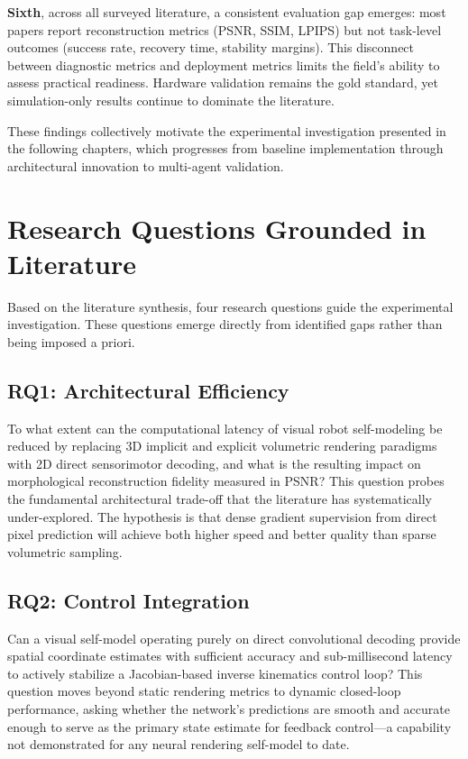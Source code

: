 \documentclass[12pt,a4paper,oneside]{report}
\begin{document}
\textbf{Sixth}, across all surveyed literature, a consistent evaluation gap emerges: most papers report reconstruction metrics (PSNR, SSIM, LPIPS) but not task-level outcomes (success rate, recovery time, stability margins). This disconnect between diagnostic metrics and deployment metrics limits the field's ability to assess practical readiness. Hardware validation remains the gold standard, yet simulation-only results continue to dominate the literature.

These findings collectively motivate the experimental investigation presented in the following chapters, which progresses from baseline implementation through architectural innovation to multi-agent validation.

\section{Research Questions Grounded in Literature}

Based on the literature synthesis, four research questions guide the experimental investigation. These questions emerge directly from identified gaps rather than being imposed a priori.

\subsection{RQ1: Architectural Efficiency}

To what extent can the computational latency of visual robot self-modeling be reduced by replacing 3D implicit and explicit volumetric rendering paradigms with 2D direct sensorimotor decoding, and what is the resulting impact on morphological reconstruction fidelity measured in PSNR? This question probes the fundamental architectural trade-off that the literature has systematically under-explored. The hypothesis is that dense gradient supervision from direct pixel prediction will achieve both higher speed and better quality than sparse volumetric sampling.

\subsection{RQ2: Control Integration}

Can a visual self-model operating purely on direct convolutional decoding provide spatial coordinate estimates with sufficient accuracy and sub-millisecond latency to actively stabilize a Jacobian-based inverse kinematics control loop? This question moves beyond static rendering metrics to dynamic closed-loop performance, asking whether the network's predictions are smooth and accurate enough to serve as the primary state estimate for feedback control—a capability not demonstrated for any neural rendering self-model to date.
\end{document}
